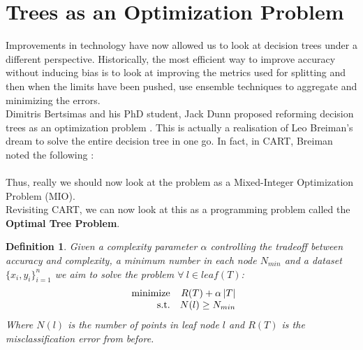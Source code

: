 \documentclass[11pt,a4paper]{report}
\newtheorem{definition}{Definition}
\begin{document}
\section{Trees as an Optimization Problem}
Improvements in technology have now allowed us to look at decision trees under a different perspective. 
Historically, the most efficient way to improve accuracy without inducing bias is to look at improving the metrics used for splitting and then when the limits have been pushed, use ensemble techniques to aggregate and minimizing the errors.\\
Dimitris Bertsimas and his PhD student, Jack Dunn proposed reforming decision trees as an optimization problem \cite{oct}. 
This is actually a realisation of Leo Breiman's dream to solve the entire decision tree in one go.
In fact, in CART, Breiman noted the following \cite[p.42]{BreimanDT}:
\bigskip\\
\bigskip\\
Thus, really we should now look at the problem as a Mixed-Integer Optimization Problem (MIO).\\
Revisiting CART, we can now look at this as a programming problem called the \textbf{Optimal Tree Problem}.\\
\begin{definition}
    Given a complexity parameter $\alpha$ controlling the tradeoff between accuracy and complexity, a minimum number in each node $N_{min}$ and a dataset $\{x_i, y_i\}_{i=1}^{n}$ we aim to solve the problem $\forall \ l \in leaf(T)$:
    \[ 
    \begin{array}{r@{}r@{}}
        \text{minimize} \quad &{} R(T) + \alpha \left|T\right|\\
        \text{s.t.} \quad &{} N(l) \geq N_{min}
    \end{array} \]
    Where $N(l)$ is the number of points in leaf node $l$ and $R(T)$ is the misclassification error from before.
\end{definition}





\end{document}
